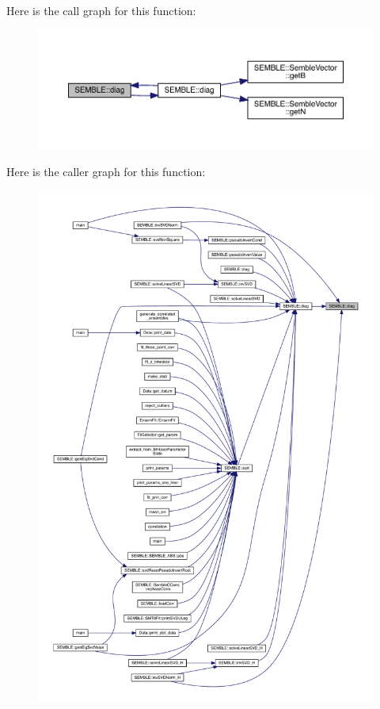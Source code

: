 Here is the call graph for this function\+:
\nopagebreak
\begin{figure}[H]
\begin{center}
\leavevmode
\includegraphics[width=350pt]{d7/dfd/namespaceSEMBLE_a9d03dce8aa30e05d79fd8a1426213671_cgraph}
\end{center}
\end{figure}
Here is the caller graph for this function\+:
\nopagebreak
\begin{figure}[H]
\begin{center}
\leavevmode
\includegraphics[width=350pt]{d7/dfd/namespaceSEMBLE_a9d03dce8aa30e05d79fd8a1426213671_icgraph}
\end{center}
\end{figure}
\mbox{\label{namespaceSEMBLE_a2e8cffa16ed652b97591f844ab63621e}} 
